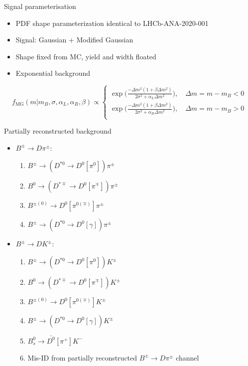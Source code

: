 \documentclass{beamer}
\begin{document}
\begin{frame}{Signal parameterisation}
  \begin{itemize}
    \setlength\itemsep{1.2em}
    \item{PDF shape parameterization identical to LHCb-ANA-2020-001}
    \item{Signal: Gaussian + Modified Gaussian}
    \item{Shape fixed from MC, yield and width floated}
    \item{Exponential background}
  \end{itemize}
  \vspace{0.5cm}
  \begin{equation*}
    f_\text{MG}(m|m_B, \sigma, \alpha_L, \alpha_R, \beta)\propto
    \begin{cases}
      \exp\Big(\frac{-\Delta m^2(1 + \beta\Delta m^2)}{2\sigma^2 + \alpha_L\Delta m^2}\Big), \quad \Delta m = m - m_B < 0 \\
      \exp\Big(\frac{-\Delta m^2(1 + \beta\Delta m^2)}{2\sigma^2 + \alpha_R\Delta m^2}\Big), \quad \Delta m = m - m_B > 0 \\
    \end{cases}
  \end{equation*}
\end{frame}

\begin{frame}{Partially reconstructed background}
  \begin{itemize}
    \setlength\itemsep{1.3em}
    \item{$B^\pm\to D\pi^\pm$:}
    \begin{enumerate}
    \setlength\itemsep{0.4em}
      \item{$B^\pm\to (D^{*0}\to D^0[\pi^0])\pi^\pm$}
      \item{$B^0\to (D^{*\mp}\to D^0[\pi^\mp])\pi^\pm$}
      \item{$B^{\pm(0)}\to D^0[\pi^{0(\mp)}]\pi^\pm$}
      \item{$B^\pm\to(D^{*0}\to D^0[\gamma])\pi^\pm$}
    \end{enumerate}
    \item{$B^\pm\to DK^\pm$:}
    \begin{enumerate}
      \setlength\itemsep{0.4em}
      \item{$B^\pm\to (D^{*0}\to D^0[\pi^0])K^\pm$}
      \item{$B^0\to (D^{*\mp}\to D^0[\pi^\mp])K^\pm$}
      \item{$B^{\pm(0)}\to D^0[\pi^{0(\mp)}]K^\pm$}
      \item{$B^\pm\to(D^{*0}\to D^0[\gamma])K^\pm$}
      \item{$B_s^0\to\bar{D^0}[\pi^+]K^-$}
      \item{Mis-ID from partially reconstructed $B^\pm\to D\pi^\pm$ channel}
    \end{enumerate}
  \end{itemize}
\end{frame}
\end{document}
